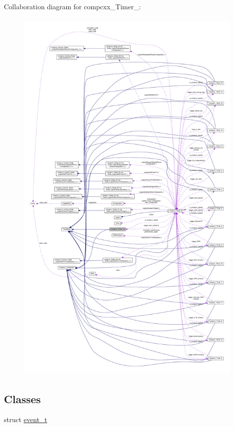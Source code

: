 Collaboration diagram for compcxx\+\_\+\+Timer\+\_\+:\nopagebreak
\begin{figure}[H]
\begin{center}
\leavevmode
\includegraphics[height=550pt]{classcompcxx__Timer__14__coll__graph}
\end{center}
\end{figure}
\subsection*{Classes}
\begin{DoxyCompactItemize}
\item 
struct \hyperlink{structcompcxx__Timer__14_1_1event__t}{event\+\_\+t}
\end{DoxyCompactItemize}

